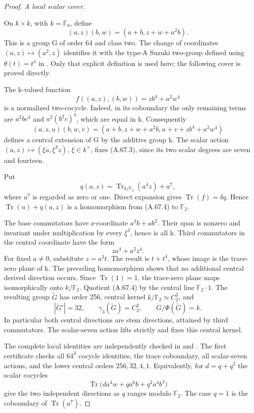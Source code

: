 \begin{proof}
\emph{A local scalar cover.}\par
On \(k\times k\), with \(k=\mathbb F_8\), define
\[
 (a,z)(b,w)=(a+b,z+w+a^2b).
 \tag{A.67.2}
\]
This is a group G of order 64 and class two. The change of coordinates
\((a,z)\mapsto(a^2,z)\) identifies it with the type-A Suzuki
two-group defined using \(\theta(t)=t^4\) in
\citet[Section 2, p.~3]{AEaton2024}. Only that explicit definition
is used here; the following cover is proved directly.

The k-valued function
\[
 f((a,z),(b,w))=z b^4+a^2w^4
 \tag{A.67.3}
\]
is a normalized two-cocycle. Indeed, in its coboundary the only
remaining terms are \(a^2bc^4\) and
\(a^2(b^2c)^4\), which are equal in k. Consequently
\[
 (a,z,u)(b,w,v)=
 (a+b,z+w+a^2b,u+v+z b^4+a^2w^4)
 \tag{A.67.4}
\]
defines a central extension of G by the additive group k.
The scalar action \((a,z)\mapsto(\xi a,\xi^3z)\),
\(\xi\in k^\times\), fixes (A.67.3), since its two
scalar degrees are seven and fourteen.

Put
\[
 q(a,z)=\operatorname{Tr}_{k/\mathbb F_2}(a^4z)+a^7,
 \tag{A.67.5}
\]
where \(a^7\) is regarded as zero or one. Direct expansion gives
\(\operatorname{Tr}(f)=\delta q\). Hence
\(\operatorname{Tr}(u)+q(a,z)\) is a homomorphism from
(A.67.4) to \(\mathbb F_2\).

The base commutators have z-coordinate \(a^2b+ab^2\).
Their span is nonzero and invariant under multiplication by
every \(\xi^3\), hence is all k. Third commutators in the central
coordinate have the form
\[
 z a^4+a^2z^4.
 \tag{A.67.6}
\]
For fixed \(a\ne0\), substitute \(z=a^3t\). The result is
\(t+t^4\), whose image is the trace-zero plane of k.
The preceding homomorphism shows that no additional central
derived direction occurs. Since \(\operatorname{Tr}(1)=1\),
the trace-zero plane maps isomorphically onto \(k/\mathbb F_2\).
Quotient (A.67.4) by the central line \(\mathbb F_2\cdot1\).
The resulting group \(\widetilde G\) has order 256, central
kernel \(k/\mathbb F_2\simeq C_2^2\), and
\[
 |\widetilde G'|=32,\qquad
 \gamma_3(\widetilde G)=C_2^2,\qquad
 \widetilde G/\Phi(\widetilde G)=k.
 \tag{A.67.7}
\]
In particular both central directions are stem directions,
attained by third commutators. The scalar-seven action lifts
strictly and fixes this central kernel.

The complete local identities are independently checked in
 and
.
The first certificate checks all \(64^3\) cocycle identities,
the trace coboundary, all scalar-seven actions, and the lower
central orders \(256,32,4,1\). Equivalently, for
\(d=q+q^2\) the scalar cocycles
\[
 \operatorname{Tr}\bigl(d a^4w+q a^6b+q^2a^4b^3\bigr)
 \tag{A.67.8}
\]
give the two independent directions as \(q\) ranges modulo
\(\mathbb F_2\). The case \(q=1\) is the coboundary of
\(\operatorname{Tr}(a^7)\).


\end{proof}
